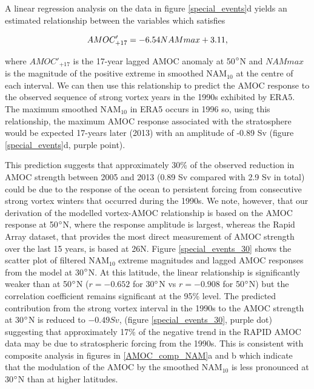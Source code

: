 A linear regression analysis on the data in figure \ref{special_events}d yields an estimated relationship between the variables which satisfies

\begin{equation}
AMOC'_{+17} = -6.54\space NAM max + 3.11,
\end{equation}

\noindent where $AMOC'_{+17}$ is the 17-year lagged AMOC anomaly at 50$\degree$N and $NAM max$ is the magnitude of the positive extreme in smoothed NAM$_{10}$ at the centre of each interval. We can then use this relationship to predict the AMOC response to the observed sequence of strong vortex years in the 1990s exhibited by ERA5. The maximum smoothed NAM$_{10}$ in ERA5 occurs in 1996 so, using this relationship, the maximum AMOC response associated with the stratosphere would be expected 17-years later (2013) with an amplitude of -0.89 Sv (figure \ref{special_events}d, purple point).

This prediction suggests that approximately 30\% of the observed reduction in AMOC strength  between 2005 and 2013 (0.89 Sv compared with 2.9 Sv in total) could be due to the response of the ocean to persistent forcing from consecutive strong vortex winters that occurred during the 1990s. We note, however, that our derivation of the modelled vortex-AMOC relationship is based on the AMOC response at 50$\degree$N, where the response amplitude is largest, whereas the Rapid Array dataset, that provides the most direct measurement of AMOC strength over the last 15 years, is based at 26N.  Figure \ref{special_events_30} shows the scatter plot of filtered NAM$_{10}$ extreme magnitudes and lagged AMOC responses from the model at 30$\degree$N. At this latitude, the linear relationship is significantly weaker than at 50$\degree$N ($r = -0.652$ for 30$\degree$N vs $r = -0.908$ for 50$\degree$N) but the correlation coefficient remains significant at the 95\% level. The predicted contribution from the strong vortex interval in the 1990s to the AMOC strength at 30$\degree$N is reduced to $-0.49Sv$,  (figure \ref{special_events_30}, purple dot) suggesting that  approximately 17\% of the negative trend in the RAPID AMOC data may be due to stratospheric forcing from the 1990s. This is consistent with composite analysis in figures in \ref{AMOC_comp_NAM}a and b which indicate that the modulation of the AMOC by the smoothed NAM$_{10}$ is less pronounced at 30$\degree$N than at higher latitudes.

